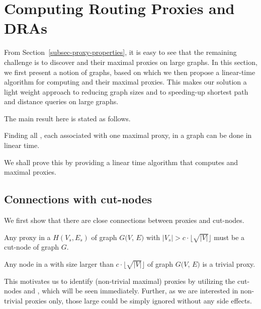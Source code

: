 \section{Computing Routing Proxies and DRAs}
\label{sec-proxy-algorithms}
From Section~\ref{subsec-proxy-properties}, it is easy to see that the remaining challenge is to discover \dras and their maximal proxies on large graphs.
In this section, we first present a notion of  \bcsketch graphs, based on which we then propose a linear-time algorithm  for computing \dras and their maximal proxies. This makes our solution a light weight approach to reducing graph sizes and to  speeding-up shortest  path and distance queries on large graphs.



The main result here is stated as follows.

\begin{theorem}
\label{thm-compute-dras} Finding all \dras, each associated with one maximal proxy, in a graph can be done in linear time.
\end{theorem}


We shall prove this by providing a linear time algorithm that computes \dras and maximal proxies.


\subsection{Connections with cut-nodes}
\label{subsec-connections}

We first show that there are close connections between proxies and cut-nodes.



\begin{prop}
\label{prop-proxy-cut} Any proxy in a \cc $H(V_s, E_s)$ of graph $G(V$, $E)$ with $|V_s|>c\cdot\lfloor\sqrt{|V|}\rfloor$ must be a cut-node of graph $G$.
\end{prop}



\begin{prop}
\label{prop-large-bcc} Any node in a \bc with size larger than $c\cdot\lfloor\sqrt{|V|}\rfloor$ of graph $G(V$, $E)$ is a trivial proxy.
\end{prop}


This motivates us to identify (non-trivial maximal) proxies by utilizing the cut-nodes and \bccs, which will be seen immediately.
Further, as we are interested in non-trivial proxies only, those large \bccs could be simply ignored without any side effects.

